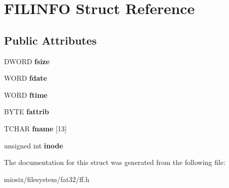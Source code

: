 \hypertarget{struct_f_i_l_i_n_f_o}{\section{F\-I\-L\-I\-N\-F\-O Struct Reference}
\label{struct_f_i_l_i_n_f_o}
}
\subsection*{Public Attributes}
\begin{DoxyCompactItemize}
\item 
\hypertarget{struct_f_i_l_i_n_f_o_aee7441af7dc0c443d1e1e6011cc7dcac}{D\-W\-O\-R\-D {\bfseries fsize}}\label{struct_f_i_l_i_n_f_o_aee7441af7dc0c443d1e1e6011cc7dcac}

\item 
\hypertarget{struct_f_i_l_i_n_f_o_a7c01c48a15b1b49da459924437b0bd52}{W\-O\-R\-D {\bfseries fdate}}\label{struct_f_i_l_i_n_f_o_a7c01c48a15b1b49da459924437b0bd52}

\item 
\hypertarget{struct_f_i_l_i_n_f_o_ae0f751b79621bf7b29669f177bbe6b9a}{W\-O\-R\-D {\bfseries ftime}}\label{struct_f_i_l_i_n_f_o_ae0f751b79621bf7b29669f177bbe6b9a}

\item 
\hypertarget{struct_f_i_l_i_n_f_o_a838d542585831b085537b363f18205c0}{B\-Y\-T\-E {\bfseries fattrib}}\label{struct_f_i_l_i_n_f_o_a838d542585831b085537b363f18205c0}

\item 
\hypertarget{struct_f_i_l_i_n_f_o_abd852510f2f79b4ec773156d8942dc7c}{T\-C\-H\-A\-R {\bfseries fname} \mbox{[}13\mbox{]}}\label{struct_f_i_l_i_n_f_o_abd852510f2f79b4ec773156d8942dc7c}

\item 
\hypertarget{struct_f_i_l_i_n_f_o_af176700db18b462ccfac6da263c129fc}{unsigned int {\bfseries inode}}\label{struct_f_i_l_i_n_f_o_af176700db18b462ccfac6da263c129fc}

\end{DoxyCompactItemize}


The documentation for this struct was generated from the following file\-:\begin{DoxyCompactItemize}
\item 
miosix/filesystem/fat32/ff.\-h\end{DoxyCompactItemize}
